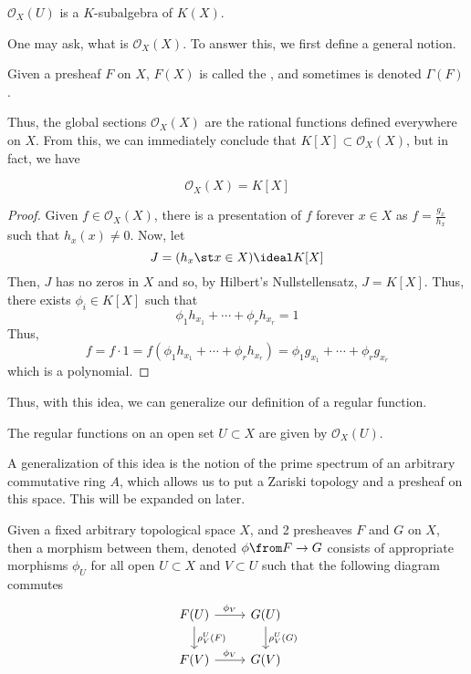 \documentclass[11pt,leqno,oneside]{amsbook}
\renewcommand{\F}{F} %
\newcommand{\G}{G}
\renewcommand{\O}{\mathcal{O}}
\numberwithin{thm}{section}
\begin{document}
\begin{prop}
  \(\O_X(U)\) is a \(K\)-subalgebra of \(K(X)\).
\end{prop}
One may ask, what is \(\O_X(X)\). To answer this, we first define a
general notion.
\begin{defn}
  Given a presheaf \(\F\) on \(X\), \(\F(X)\) is called the , and sometimes is denoted \(\Gamma(\F)\).
\end{defn}
Thus, the global sections \(\O_X(X)\) are the rational functions
defined everywhere on \(X\). From this, we can immediately conclude
that \(K[X] \subset \O_X(X)\), but in fact, we have
\begin{prop}
  \[
    \O_X(X) = K[X]
  \]
\end{prop}
\begin{proof}
  Given \(f \in \O_X(X)\), there is a presentation of \(f\) forever
  \(x \in X\) as \(f = \frac{g_x}{h_x}\) such that \(h_x(x) \neq
  0\). Now, let \[
    J = (h_x \st x \in X) \ideal K[X]
  \]
  Then, \(J\) has no zeros in \(X\) and so, by Hilbert's
  Nullstellensatz, \(J = K[X]\). Thus, there exists \(\phi_i \in
  K[X]\) such that \[
    \phi_1 h_{x_1} + \cdots + \phi_r h_{x_r} = 1
  \]
  Thus, \[
    f = f \cdot 1 = f(\phi_1 h_{x_1} + \cdots + \phi_r h_{x_r}) =
    \phi_1 g_{x_1} + \cdots + \phi_r g_{x_r}
  \]
  which is a polynomial.
\end{proof}
Thus, with this idea, we can generalize our definition of a regular
function.
\begin{defn}
  The regular functions on an open set \(U \subset X\) are given by
  \(\O_X(U)\). 
\end{defn}
\begin{rmk}
  A generalization of this idea is the notion of the prime spectrum of
  an arbitrary commutative ring \(A\), which allows us to put a
  Zariski topology and a presheaf on this space.  This will be
  expanded on later.
\end{rmk}
\begin{defn}
  Given a fixed arbitrary topological space \(X\), and 2 presheaves
  \(\F\) and \(\G\) on \(X\), then a morphism between them, denoted
  \(\phi \from F \to G\) consists of appropriate morphisms \(\phi_U\)
  for all open \(U \subset X\) and \(V \subset U\) such that the
  following diagram 
  commutes \[
    \begin{tikzcd}
      \F(U) \ar[d,"\rho^U_V(\F)"] \ar[r,"\phi_V"] & \G(U)
      \ar[d,"\rho^U_V(\G)"] \\
      \F(V) \ar[r, "\phi_V"] & \G(V)
    \end{tikzcd}
  \]
\end{defn}
\end{document}
